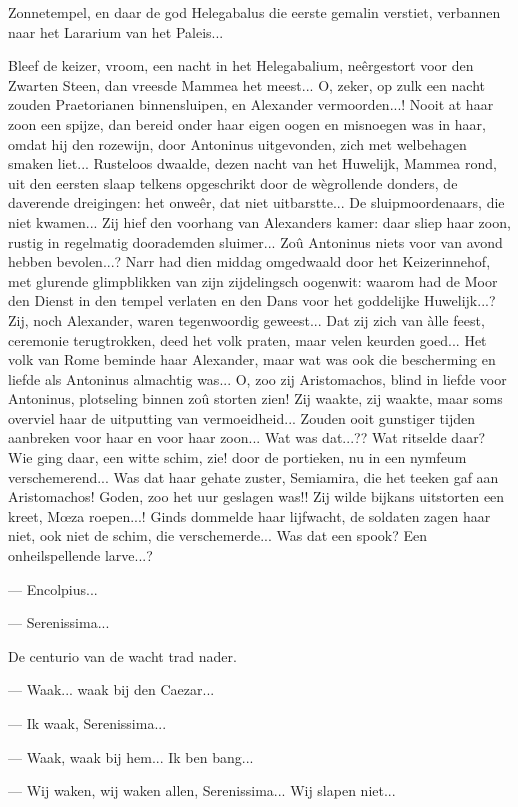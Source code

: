 \documentclass[a4paper, 12pt, oneside, dutch]{article}
\begin{document}
Zonnetempel, en daar de god Helegabalus die eerste gemalin verstiet, verbannen naar het Lararium van het Paleis...

Bleef de keizer, vroom, een nacht in het Helegabalium, neêrgestort voor den Zwarten Steen, dan vreesde Mammea het meest... O, zeker, op zulk een nacht zouden Praetorianen binnensluipen, en Alexander vermoorden...! Nooit at haar zoon een spijze, dan bereid onder haar eigen oogen en misnoegen was in haar, omdat hij den rozewijn, door Antoninus uitgevonden, zich met welbehagen smaken liet... Rusteloos dwaalde, dezen nacht van het Huwelijk, Mammea rond, uit den eersten slaap telkens opgeschrikt door de wègrollende donders, de daverende dreigingen: het onweêr, dat niet uitbarstte... De sluipmoordenaars, die niet kwamen... Zij hief den voorhang van Alexanders kamer: daar sliep haar zoon, rustig in regelmatig doorademden sluimer... Zoû Antoninus niets voor van avond hebben bevolen...? Narr had dien middag omgedwaald door het Keizerinnehof, met glurende glimpblikken van zijn zijdelingsch oogenwit: waarom had de Moor den Dienst in den tempel verlaten en den Dans voor het goddelijke Huwelijk...? Zij, noch Alexander, waren tegenwoordig geweest... Dat zij zich van àlle feest, ceremonie terugtrokken, deed het volk praten, maar velen keurden goed... Het volk van Rome beminde haar Alexander, maar wat was ook die bescherming en liefde als Antoninus almachtig was... O, zoo zij Aristomachos, blind in liefde voor Antoninus, plotseling binnen zoû storten zien! Zij waakte, zij waakte, maar soms overviel haar de uitputting van vermoeidheid... Zouden ooit gunstiger tijden aanbreken voor haar en voor haar zoon... Wat was dat...?? Wat ritselde daar? Wie ging daar, een witte schim, zie! door de portieken, nu in een nymfeum verschemerend... Was dat haar gehate zuster, Semiamira, die het teeken gaf aan Aristomachos! Goden, zoo het uur geslagen was!! Zij wilde bijkans uitstorten een kreet, Mœza roepen...! Ginds dommelde haar lijfwacht, de soldaten zagen haar niet, ook niet de schim, die verschemerde... Was dat een spook? Een onheilspellende larve...?

--- Encolpius...

--- Serenissima...

De centurio van de wacht trad nader.

--- Waak... waak bij den Caezar...

--- Ik waak, Serenissima...

--- Waak, waak bij hem... Ik ben bang...

--- Wij waken, wij waken allen, Serenissima... Wij slapen niet...
\end{document}
